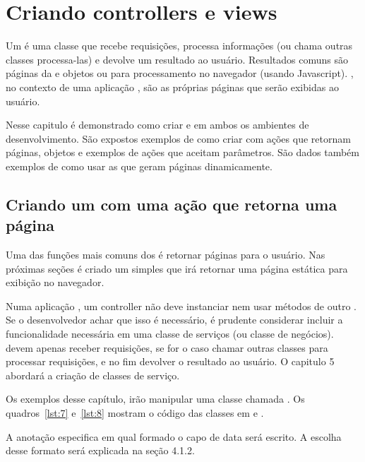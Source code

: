 \chapter{Criando controllers e views}

Um  é uma classe que  recebe requisições, processa informações (ou chama outras classes processa-las) e devolve um resultado ao usuário. Resultados comuns são páginas da  e objetos  ou  para processamento no navegador (usando Javascript). , no contexto de uma aplicação , são as próprias páginas que serão exibidas ao usuário.

Nesse capitulo é demonstrado como criar  e  em ambos os ambientes de desenvolvimento. São expostos exemplos de como criar  com ações que retornam páginas, objetos  e exemplos de ações que aceitam parâmetros. São dados também exemplos de como usar as  que geram páginas  dinamicamente.

\section{Criando um  com uma ação que retorna uma página}

Uma das funções mais comuns dos  é retornar páginas para o usuário. Nas próximas seções é criado um  simples que irá retornar uma página estática para exibição no navegador.

Numa aplicação , um controller não deve instanciar nem usar métodos de outro . Se o desenvolvedor achar que isso é necessário, é prudente considerar incluir a funcionalidade necessária em uma classe de serviços (ou classe de negócios).  devem apenas receber requisições, se for o caso chamar outras classes para processar requisições, e no fim devolver o resultado ao usuário. O capitulo 5 abordará a criação de classes de serviço.

Os exemplos desse capítulo, irão manipular uma classe chamada . Os quadros~\ref{lst:7} e~\ref{lst:8} mostram o código das classes em  e .


A anotação  especifica em qual formado o capo de data será escrito. A escolha desse formato será explicada na seção 4.1.2.

